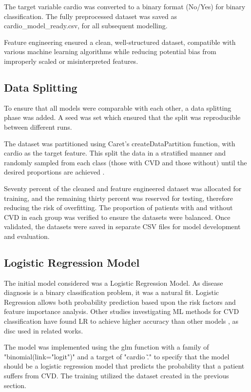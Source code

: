 \documentclass[conference]{IEEEtran}
\begin{document}
The target variable cardio was converted to a binary format (No/Yes) for binary classification. The fully preprocessed dataset was saved as cardio\_model\_ready.csv, for all subsequent modelling.

Feature engineering ensured a clean, well-structured dataset, compatible with various machine learning algorithms while reducing potential bias from improperly scaled or misinterpreted features. 

\subsection{Data Splitting}
To ensure that all models were comparable with each other, a data splitting phase was added.
A seed was set which ensured that the split was reproducible between different runs. 

The dataset was partitioned using Caret's createDataPartition function, with cardio as the target feature. This split the data in a stratified manner and randomly sampled from each class (those with CVD and those without) until the desired proportions are achieved \cite{DATAPART}.

Seventy percent of the cleaned and feature engineered dataset was allocated for training, and the remaining thirty percent was reserved for testing, therefore reducing the risk of overfitting.
The proportion of patients with and without CVD in each group was verified to ensure the datasets were balanced. Once validated, the datasets were saved in separate CSV files for model development and evaluation. 

\subsection{Logistic Regression Model}
The initial model considered was a Logistic Regression Model. As disease diagnosis is a binary classification problem, it was a natural fit. Logistic Regression allows both probability prediction based upon the risk factors and feature importance analysis. Other studies investigating ML methods for CVD classification have found LR to achieve higher accuracy than other models \cite{OTHERLOGREG}, as disc
used in related works.

The model was implemented using the glm function with a family of "binomial(link="logit")" and a target of "cardio \~ ." to specify that the model should be a logistic regression model that predicts the probability that a patient suffers from CVD. The training utilized the dataset created in the previous section.
\end{document}
